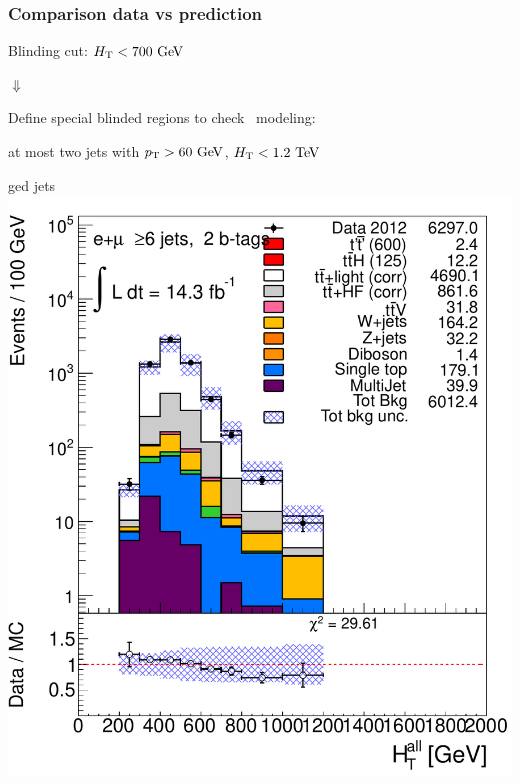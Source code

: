 \begin{frame}\frametitle{Comparison data vs prediction}
\centering\footnotesize

Blinding cut: $\HT<700\gev$

{\Large$\Downarrow$}

Define special blinded regions to check \HT\ modeling:

\myskip

at most two jets with $\pt>60\gev$, $\HT<1.2\tev$

\begin{minipage}{.45\textwidth} \btag ged jets\\
\includegraphics[width=.8\textwidth]{pics/htx_httails/HTAll_ELEMUON_6jetin2btagex_NOMINAL_logscale}

\end{minipage}\begin{minipage}{.45\textwidth}\centering


\end{minipage}
\end{frame}

